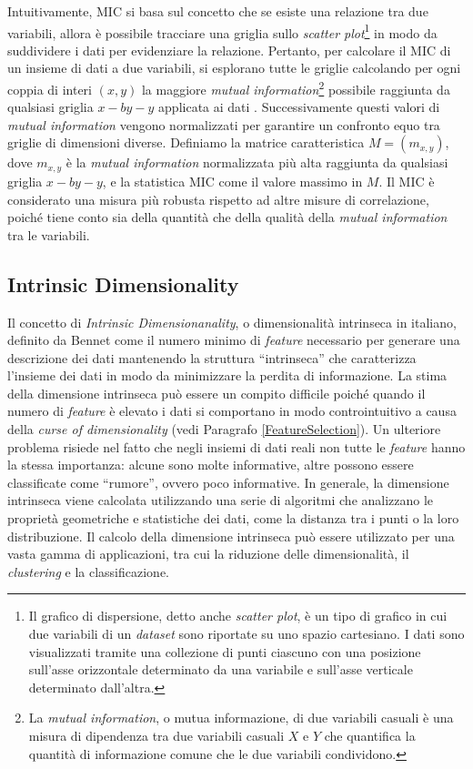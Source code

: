 \documentclass[12pt,italian]{report}
\begin{document}
	
	Intuitivamente, MIC si basa sul concetto che se esiste una relazione tra due variabili, allora è possibile tracciare una griglia sullo \textit{scatter plot}\footnote{Il grafico di dispersione, detto anche \textit{scatter plot}, è un tipo di grafico in cui due variabili di un \textit{dataset} sono riportate su uno spazio cartesiano. I dati sono visualizzati tramite una collezione di punti ciascuno con una posizione sull'asse orizzontale determinato da una variabile e sull'asse verticale determinato dall'altra.} in modo da suddividere i dati per evidenziare la relazione. 
	Pertanto, per calcolare il MIC di un insieme di dati a due variabili, si esplorano tutte le griglie calcolando per ogni coppia di interi $(x,y)$ la maggiore \textit{mutual information}\footnote{La \textit{mutual information}, o mutua informazione, di due variabili casuali è una misura di dipendenza tra due variabili casuali $X$ e $Y$ che quantifica la quantità di informazione comune che le due variabili condividono.} possibile raggiunta da qualsiasi griglia $x-by-y$ applicata ai dati \cite{articleMIC}.
	Successivamente questi valori di \textit{mutual information} vengono normalizzati per garantire un confronto equo tra griglie di dimensioni diverse. Definiamo la matrice caratteristica $M = (m_{x,y})$, dove $m_{x,y}$ è la \textit{mutual information} normalizzata più alta raggiunta da qualsiasi griglia $x-by-y$, e la statistica MIC come il valore massimo in $M$.
	Il MIC è considerato una misura più robusta rispetto ad altre misure di correlazione, poiché tiene conto sia della quantità che della qualità della \textit{mutual information} tra le variabili.
	
	\subsection{Intrinsic Dimensionality}
	\label{IntrinsicDimension}
	Il concetto di \textit{Intrinsic Dimensionanality}, o dimensionalità intrinseca in italiano, definito da Bennet \cite{Bennett1969TheID} come il numero minimo di \textit{feature} necessario per generare una descrizione dei dati mantenendo la struttura ``intrinseca'' che caratterizza l'insieme dei dati in modo da minimizzare la perdita di informazione.
	La stima della dimensione intrinseca può essere un compito difficile poiché quando il numero di \textit{feature} è elevato i dati si comportano in modo controintuitivo a causa della \textit{curse of dimensionality} (vedi Paragrafo \ref{FeatureSelection}). Un ulteriore problema risiede nel fatto che negli insiemi di dati reali non tutte le \textit{feature} hanno la stessa importanza: alcune sono molte informative, altre possono essere classificate come ``rumore'', ovvero poco informative. In generale, la dimensione intrinseca viene calcolata utilizzando una serie di algoritmi che analizzano le proprietà geometriche e statistiche dei dati, come la distanza tra i punti o la loro distribuzione. Il calcolo della dimensione intrinseca può essere utilizzato per una vasta gamma di applicazioni, tra cui la riduzione delle dimensionalità, il \textit{clustering} e la classificazione.
	
\end{document}
